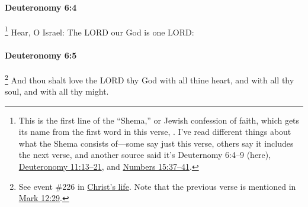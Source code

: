 		\paragraph{Deuteronomy 6:4} %
			\label{DEUTERONOMY-6-4}

				\footnote{%
					This is the first line of the ``Shema,'' or Jewish confession of faith, which gets its name from the first word in this verse, . I've read different things about what the Shema consists of---some say just this verse, others say it includes the next verse, and another source said it's Deuternomy 6:4--9 (here), \hyperref[DEUTERONOMY-11-13]{Deuteronomy 11:13--21}, and \hyperref[NUMBERS-15-37]{Numbers 15:37--41}.
					}%
			Hear, O Israel: The LORD our God is one LORD:

			\begin{framed}
			\scriptsize
				\begin{compactdesc}
					\item[BHS] 
				\end{compactdesc}
			\end{framed}

		\paragraph{Deuteronomy 6:5} %
			\label{DEUTERONOMY-6-5}

				\footnote{%
					See event \#226 in \hyperref[LCHRIST]{Christ's life}. Note that the previous verse is mentioned in \hyperref[MARK-12-29]{Mark 12:29}.
					}%
			And thou shalt love the LORD thy God with all thine heart, and with all thy soul, and with all thy might.

